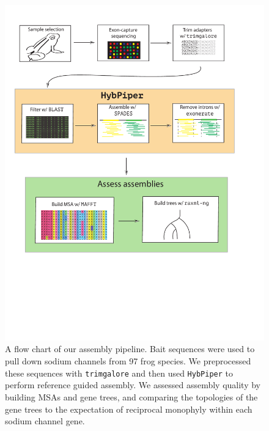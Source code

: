 \documentclass{article}
\begin{document}
\begin{figure}[h!]
    \centering
    \includegraphics[scale=0.9]{figures/flow_chart.pdf}
    \caption{A flow chart of our assembly pipeline. Bait sequences were used to pull down sodium channels from 97 frog species. We preprocessed these sequences with \texttt{trimgalore} and then used \texttt{HybPiper} to perform reference guided assembly. We assessed assembly quality by building MSAs and gene trees, and comparing the topologies of the gene trees to the expectation of reciprocal monophyly within each sodium channel gene.}
    \label{fig:my_label}
\end{figure}
\clearpage
\end{document}

